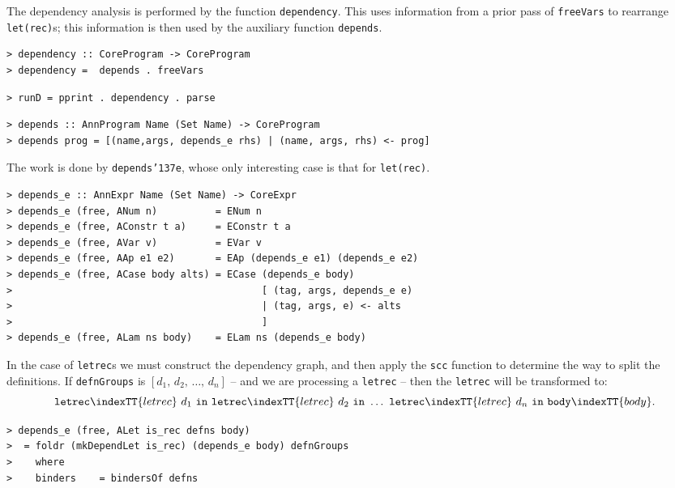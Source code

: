 The dependency analysis is performed by the function \mbox{\tt dependency}.
This uses information from a prior pass of \mbox{\tt freeVars} to rearrange
\mbox{\tt let(rec)}s; this information is then used by the auxiliary function
\mbox{\tt depends}.
\begin{verbatim}
> dependency :: CoreProgram -> CoreProgram
> dependency =  depends . freeVars
\end{verbatim}
%
%
\begin{verbatim}
> runD = pprint . dependency . parse
\end{verbatim}
%
\begin{verbatim}
> depends :: AnnProgram Name (Set Name) -> CoreProgram
> depends prog = [(name,args, depends_e rhs) | (name, args, rhs) <- prog]
\end{verbatim}
%
%
The work is done by \mbox{\tt depends{\char'137}e}, whose only interesting case is
that for \mbox{\tt let(rec)}.
\begin{verbatim}
> depends_e :: AnnExpr Name (Set Name) -> CoreExpr
> depends_e (free, ANum n)          = ENum n
> depends_e (free, AConstr t a)     = EConstr t a
> depends_e (free, AVar v)          = EVar v
> depends_e (free, AAp e1 e2)       = EAp (depends_e e1) (depends_e e2)
> depends_e (free, ACase body alts) = ECase (depends_e body)
>                                           [ (tag, args, depends_e e)
>                                           | (tag, args, e) <- alts
>                                           ]
> depends_e (free, ALam ns body)    = ELam ns (depends_e body)
\end{verbatim}
In the case of \mbox{\tt letrec}s we must construct the dependency graph, and
then apply the \mbox{\tt scc} function to determine the way to split the
definitions. If \mbox{\tt defnGroups} is $[d_1,\,d_2,\,\ldots,\,d_n]$ -- and we
are processing a \mbox{\tt letrec} -- then the \mbox{\tt letrec} will be transformed to:
\[
 \mbox{\tt letrec}\indexTT{letrec}~d_1~\mbox{\tt in}~\mbox{\tt letrec}\indexTT{letrec}~d_2~\mbox{\tt in}~\ldots ~\mbox{\tt letrec}\indexTT{letrec}~d_n~\mbox{\tt in}~ \mbox{\tt body}\indexTT{body}.
\]
\begin{verbatim}
> depends_e (free, ALet is_rec defns body)
>  = foldr (mkDependLet is_rec) (depends_e body) defnGroups
>    where
>    binders    = bindersOf defns
\end{verbatim}

